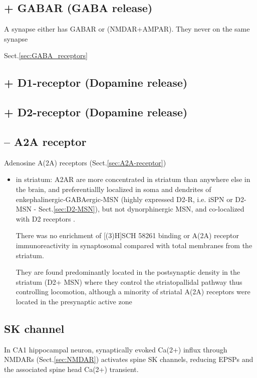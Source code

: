 \subsection{+ GABAR (GABA release)}

A synapse either has GABAR or (NMDAR+AMPAR). They never on the same synapse

Sect.\ref{sec:GABA_receptors}

\subsection{+ D1-receptor (Dopamine release)}

\subsection{+ D2-receptor (Dopamine release)}

\subsection{-- A2A receptor}
\label{sec:A2AReceptor-post-synaptic-side}

Adenosine A(2A) receptors (Sect.\ref{sec:A2A-receptor}) 
\begin{itemize}
  
  \item in striatum: A2AR are more concentrated in striatum than anywhere else
  in the brain, and preferentiallly localized in soma and dendrites of
  enkephalinergic-GABAergic-MSN (highly expressed D2-R, i.e. iSPN or D2-MSN -
  Sect.\ref{sec:D2-MSN}), but not dynorphinergic MSN, and 
  co-localized with D2 receptors .
  
  There was no enrichment of [(3)H]SCH 58261 binding or A(2A) receptor
  immunoreactivity in synaptosomal compared with total membranes from the
  striatum.
  
  They are found predominantly located in the postsynaptic density in the
  striatum (D2+ MSN) where they control the striatopallidal pathway thus
  controlling locomotion, although a minority of striatal A(2A) receptors were
  located in the presynaptic active zone

  
\end{itemize}

\subsection{SK channel}

In CA1 hippocampal neuron, synaptically evoked Ca(2+) influx through NMDARs
(Sect.\ref{sec:NMDAR}) activates spine SK channels, reducing EPSPs and the
associated spine head Ca(2+) transient.

